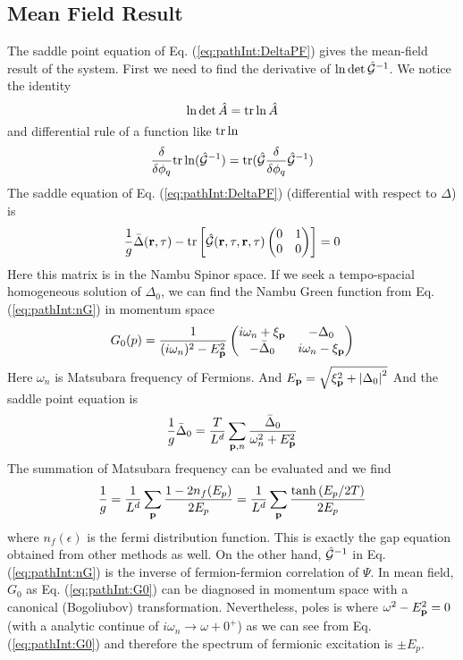 \subsection{Mean Field Result}
The saddle point equation of Eq. (\ref{eq:pathInt:DeltaPF}) gives the mean-field result of the system.  First we need to find the derivative of $\ln\det\hat{\mathcal{G}}^{-1}$.  We notice the identity
\begin{equation}
\ln\det\hat{A}=\text{tr}\ln\hat{A}
\end{equation}
and differential rule of a function like $\text{tr}\ln$
\begin{equation}\label{eq:pathInt:diffTr}
\frac{\delta}{\delta\phi_q}\text{tr}\ln(\hat{\mathcal{G}}^{-1})=\text{tr}(\hat{\mathcal{G}}\frac{\delta}{\delta\phi_q}\hat{\mathcal{G}}^{-1})
\end{equation}
The saddle equation of Eq. (\ref{eq:pathInt:DeltaPF}) (differential with respect to $\Delta$) is
\begin{equation}
\frac{1}{g}\bar{\Delta}(\mathbf{r},\tau)-\text{tr}\left[\hat{\mathcal{G}}(\mathbf{r},\tau,\mathbf{r},\tau)\begin{pmatrix}0&1\\0&0\end{pmatrix}\right]=0
\end{equation}
Here this matrix is in the Nambu Spinor space.  If we seek a tempo-spacial homogeneous solution of $\Delta_0$, we can find the Nambu Green function from Eq. (\ref{eq:pathInt:nG}) in momentum space
\begin{equation}\label{eq:pathInt:G0}
G_0(p)=\frac{1}{(i\omega_n)^2-E_{\mathbf{p}}^2}
\begin{pmatrix}
	i\omega_n+\xi_{\mathbf{p}}&-\Delta_0\\
	-\bar{\Delta}_0&i\omega_n-\xi_{\mathbf{p}}
\end{pmatrix}
\end{equation}
Here $\omega_n$ is Matsubara frequency of Fermions.   And $E_{\mathbf{p}}=\sqrt{\xi_{\mathbf{p}}^2+\left\lvert{\Delta_0}\right\rvert^2}$ And the saddle point equation is 
\begin{equation}
\frac{1}{g}\bar{\Delta}_0=\frac{T}{L^d}\sum_{\mathbf{p},n}\frac{\bar\Delta_0}{\omega_n^2+E_{\mathbf{p}}^2}
\end{equation}
The summation of Matsubara frequency can be evaluated and we find 
\begin{equation}
\frac{1}{g}=\frac{1}{L^d}\sum_{\mathbf{p}}\frac{1-2n_f(E_p)}{2E_p}=\frac{1}{L^d}\sum_{\mathbf{p}}\frac{\tanh{(E_p/2T)}}{2E_p}
\label{eq:pathInt:gap}
\end{equation}
where $n_f(\epsilon)$ is the fermi distribution function.  This is exactly the gap equation obtained from other methods as well.  On the other hand, $\hat{\mathcal{G}}^{-1}$ in Eq. (\ref{eq:pathInt:nG})  is the inverse of fermion-fermion correlation of $\Psi$.  In mean field, $G_{0}$ as Eq. (\ref{eq:pathInt:G0}) can be diagnosed in momentum space with a canonical (Bogoliubov) transformation.  Nevertheless, poles is where  $\omega^2-E_{\mathbf{p}}^2=0$ (with a analytic continue of $i\omega_{n}\rightarrow\omega+0^{+}$) as we can see from  Eq. (\ref{eq:pathInt:G0}) and therefore the spectrum of fermionic excitation is $\pm{}E_{p}$.  

